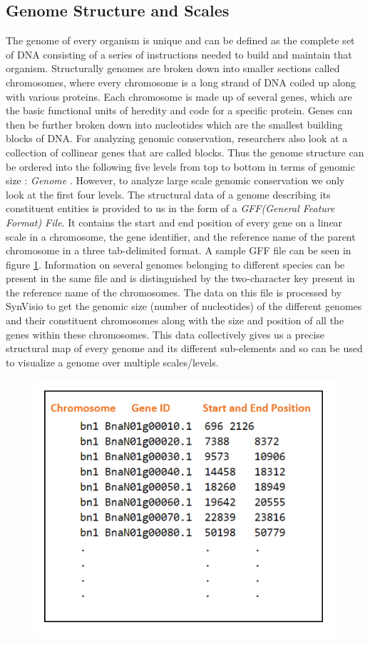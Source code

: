 \subsection{Genome Structure and Scales}
The genome of every organism is unique and can be defined as the complete set of DNA consisting of a series of instructions needed to build and maintain that organism. Structurally genomes are broken down into smaller sections called chromosomes, where every chromosome is a long strand of DNA coiled up along with various proteins. Each chromosome is made up of several genes, which are the basic functional units of heredity and code for a specific protein. Genes can then be further broken down into nucleotides which are the smallest building blocks of DNA. For analyzing genomic conservation, researchers also look at a collection of collinear genes that are called blocks. Thus the genome structure can be ordered into the following five levels from top to bottom in terms of genomic size : \textit{Genome }. However, to analyze large scale genomic conservation we only look at the first four levels. The structural data of a genome describing its constituent entities is provided to us in the form of a \textit{GFF(General Feature Format) File}. It contains the start and end position of every gene on a linear scale in a chromosome, the gene identifier, and the reference name of the parent chromosome in a three tab-delimited format. A sample GFF file can be seen in figure \ref{fig:ch_3_gff_file}.  Information on several genomes belonging to different species can be present in the same file and is distinguished by the two-character key present in the reference name of the chromosomes. The data on this file is processed by SynVisio to get the genomic size (number of nucleotides) of the different genomes and their constituent chromosomes along with the size and position of all the genes within these chromosomes. This data collectively gives us a precise structural map of every genome and its different sub-elements and so can be used to visualize a genome over multiple scales/levels.

\begin{figure}[h]
  \centering
  \includegraphics[width=.55\linewidth]{images/ch_3_gff_file.PNG}
  \label{fig:ch_3_gff_file}
\end{figure}



